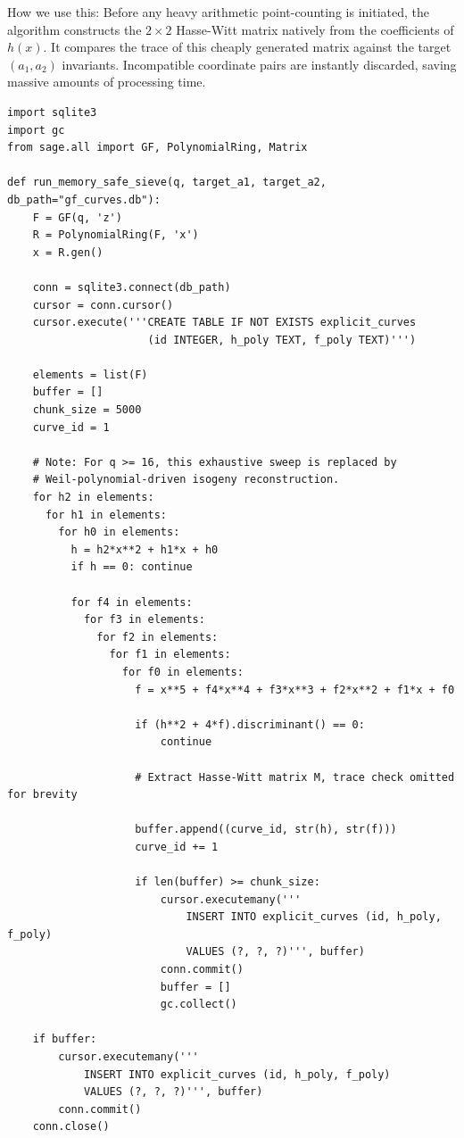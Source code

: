 \documentclass[letterpaper, 11pt]{article}
\begin{document}
How we use this: Before any heavy arithmetic point-counting is initiated, the algorithm constructs the $2 \times 2$ Hasse-Witt matrix natively from the coefficients of $h(x)$. It compares the trace of this cheaply generated matrix against the target $(a_1, a_2)$ invariants. Incompatible coordinate pairs are instantly discarded, saving massive amounts of processing time.

\begin{lstlisting}
import sqlite3
import gc
from sage.all import GF, PolynomialRing, Matrix

def run_memory_safe_sieve(q, target_a1, target_a2, db_path="gf_curves.db"):
    F = GF(q, 'z')
    R = PolynomialRing(F, 'x')
    x = R.gen()
    
    conn = sqlite3.connect(db_path)
    cursor = conn.cursor()
    cursor.execute('''CREATE TABLE IF NOT EXISTS explicit_curves
                      (id INTEGER, h_poly TEXT, f_poly TEXT)''')
    
    elements = list(F)
    buffer = []
    chunk_size = 5000
    curve_id = 1
    
    # Note: For q >= 16, this exhaustive sweep is replaced by 
    # Weil-polynomial-driven isogeny reconstruction.
    for h2 in elements:
      for h1 in elements:
        for h0 in elements:
          h = h2*x**2 + h1*x + h0
          if h == 0: continue
          
          for f4 in elements:
            for f3 in elements:
              for f2 in elements:
                for f1 in elements:
                  for f0 in elements:
                    f = x**5 + f4*x**4 + f3*x**3 + f2*x**2 + f1*x + f0
                    
                    if (h**2 + 4*f).discriminant() == 0:
                        continue
                        
                    # Extract Hasse-Witt matrix M, trace check omitted for brevity
                    
                    buffer.append((curve_id, str(h), str(f)))
                    curve_id += 1
                    
                    if len(buffer) >= chunk_size:
                        cursor.executemany('''
                            INSERT INTO explicit_curves (id, h_poly, f_poly)
                            VALUES (?, ?, ?)''', buffer)
                        conn.commit()
                        buffer = []
                        gc.collect() 
                        
    if buffer:
        cursor.executemany('''
            INSERT INTO explicit_curves (id, h_poly, f_poly)
            VALUES (?, ?, ?)''', buffer)
        conn.commit()
    conn.close()
\end{lstlisting}
\end{document}
